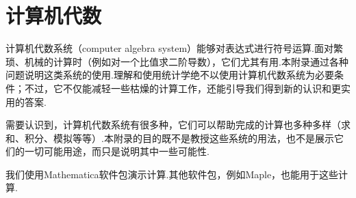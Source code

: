 \clearpage\section*{计算机代数}\label{app:computer-algebra}
\begingroup
\renewcommand{\thesection}{\arabic{section}}
\setcounter{section}{12}\setcounter{subsection}{6}\setcounter{theorem}{0}
计算机代数系统（computer algebra system）能够对表达式进行符号运算.面对繁琐、机械的计算时（例如对一个比值求二阶导数），它们尤其有用.本附录通过各种问题说明这类系统的使用.理解和使用统计学绝不以使用计算机代数系统为必要条件；不过，它不仅能减轻一些枯燥的计算工作，还能引导我们得到新的认识和更实用的答案.

需要认识到，计算机代数系统有很多种，它们可以帮助完成的计算也多种多样（求和、积分、模拟等等）.本附录的目的既不是教授这些系统的用法，也不是展示它们的一切可能用途，而只是说明其中一些可能性.

我们使用Mathematica软件包演示计算.其他软件包，例如Maple，也能用于这些计算.


